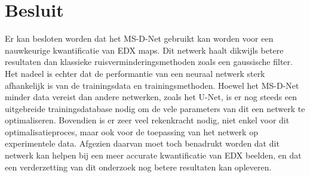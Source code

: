 \documentclass{report}
\begin{document}
\section{Besluit}
Er kan besloten worden dat het MS-D-Net gebruikt kan worden voor een nauwkeurige kwantificatie van EDX maps. Dit netwerk haalt dikwijls betere resultaten dan klassieke ruisverminderingsmethoden zoals een gaussische filter. Het nadeel is echter dat de performantie van een neuraal netwerk sterk afhankelijk is van de trainingsdata en trainingsmethoden. Hoewel het MS-D-Net minder data vereist dan andere netwerken, zoals het U-Net, is er nog steeds een uitgebreide trainingsdatabase nodig om de vele parameters van dit een netwerk te optimaliseren. Bovendien is er zeer veel rekenkracht nodig, niet enkel voor dit optimalisatieproces, maar ook voor de toepassing van het netwerk op experimentele data. Afgezien daarvan moet toch benadrukt worden dat dit netwerk kan helpen bij een meer accurate kwantificatie van EDX beelden, en dat een verderzetting van dit onderzoek nog betere resultaten kan opleveren.
\end{document}
